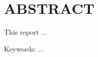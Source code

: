 \chapter*{ABSTRACT}

\begingroup


  \fontsize{13pt}{16.9pt}\selectfont

    This report ...
    
    Keywords: ...

\endgroup